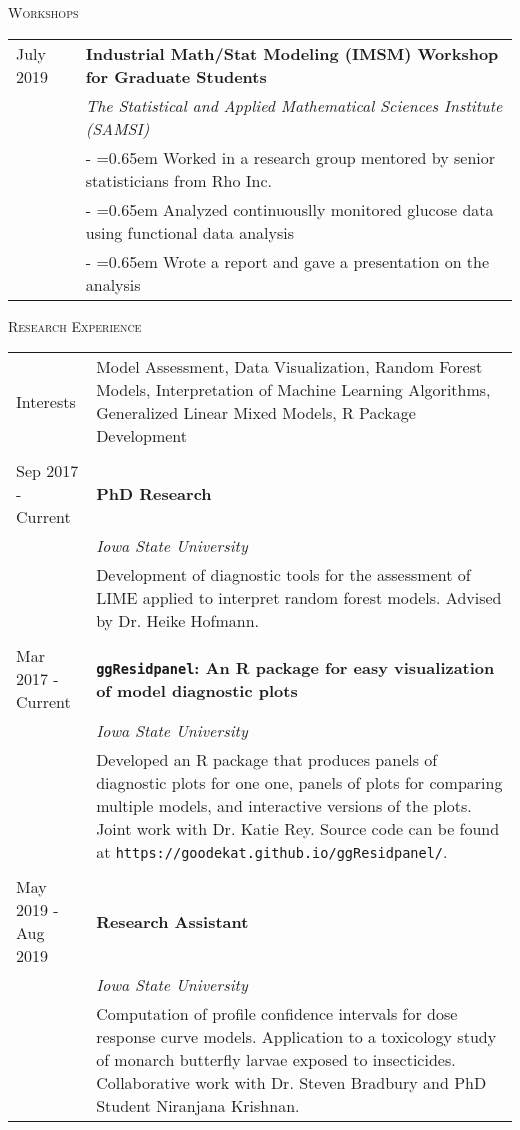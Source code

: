 \documentclass[10pt, oneside]{article}
\begin{document}
\noindent \textsc{Workshops} \hrulefill
\begin{longtable}{p{3.5cm}p{13cm}}
\hfill{July 2019} & \textbf{Industrial Math/Stat Modeling (IMSM) Workshop for Graduate Students}\\
& \emph{The Statistical and Applied Mathematical Sciences Institute (SAMSI)} \vspace{0.1cm}\\
& - \hangindent=0.65em \hangafter=1 Worked in a research group mentored by senior statisticians from Rho Inc.\\
& - \hangindent=0.65em \hangafter=1 Analyzed continuouslly monitored glucose data using functional data analysis\\
& - \hangindent=0.65em \hangafter=1 Wrote a report and gave a presentation on the analysis\\
\end{longtable}

\noindent \textsc{Research Experience} \hrulefill

\begin{longtable}{p{3.5cm}p{13cm}}
\hfill{Interests} & Model Assessment, Data Visualization, Random Forest Models, Interpretation of Machine Learning Algorithms, Generalized Linear Mixed Models, R Package Development\\
\\
\hfill{Sep 2017 - Current} & \textbf{PhD Research}\\
& \emph{Iowa State University}\\
& Development of diagnostic tools for the assessment of LIME applied to interpret random forest models. Advised by Dr. Heike Hofmann.\\
\\
\hfill{Mar 2017 - Current} & \textbf{\texttt{ggResidpanel}: An R package for easy visualization of model diagnostic plots}\\
& \emph{Iowa State University}\\
& Developed an R package that produces panels of diagnostic plots for one one, panels of plots for comparing multiple models, and interactive versions of the plots. Joint work with Dr. Katie Rey. Source code can be found at \texttt{https://goodekat.github.io/ggResidpanel/}.\\
\\
\hfill{May 2019 - Aug 2019} & \textbf{Research Assistant}\\
& \emph{Iowa State University}\\
& Computation of profile confidence intervals for dose response curve models. Application to a toxicology study of monarch butterfly larvae exposed to insecticides. Collaborative work with Dr. Steven Bradbury and PhD Student Niranjana Krishnan.
\end{longtable}
\end{document}
